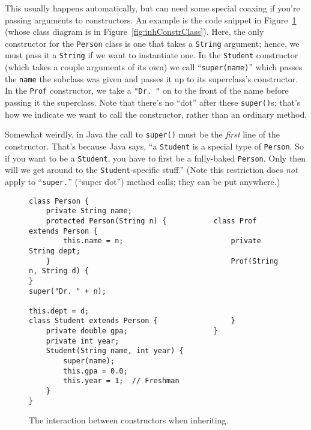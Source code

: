This usually happens automatically, but can need some special coaxing if
you're passing arguments to constructors. An example is the code snippet in
Figure~\ref{fig:inhConstrCode} (whose class diagram is in
Figure~\ref{fig:inhConstrClass}). Here, the only constructor for the
\texttt{Person} class is one that takes a \texttt{String} argument; hence, we
must pass it a \texttt{String} if we want to instantiate one. In the
\texttt{Student} constructor (which takes a couple arguments of its own) we
call ``\texttt{super(name)}'' which passes the \texttt{name} the subclass was
given and passes it up to its superclass's constructor. In the
\texttt{Prof} constructor, we take a \texttt{"Dr.\ "} on to the front of
the name before passing it the superclass. Note that there's no ``dot'' after
these \texttt{super()}s; that's how we indicate we want to call the
constructor, rather than an ordinary method.

Somewhat weirdly, in Java the call to \texttt{super()} must be the
\textit{first} line of the constructor. That's because Java says, ``a
\texttt{Student} is a special type of \texttt{Person}. So if you want to be a
\texttt{Student}, you have to first be a fully-baked \texttt{Person}. Only
then will we get around to the \texttt{Student}-specific stuff.'' (Note this
restriction does \textit{not} apply to ``\texttt{super.}'' (``super dot'')
method calls; they can be put anywhere.)

\begin{figure}[ht]
\begin{Verbatim}[fontsize=\scriptsize,samepage=true,frame=single]
class Person {                    
    private String name;          
    protected Person(String n) {           class Prof extends Person {
        this.name = n;                         private String dept;
    }                                          Prof(String n, String d) {
}                                                  super("Dr. " + n);
                                                   this.dept = d;
class Student extends Person {                 }
    private double gpa;                    }
    private int year;
    Student(String name, int year) {
        super(name);
        this.gpa = 0.0;
        this.year = 1;  // Freshman
    }
}
\end{Verbatim}
\caption{The interaction between constructors when inheriting.}
\label{fig:inhConstrCode}
\end{figure}


